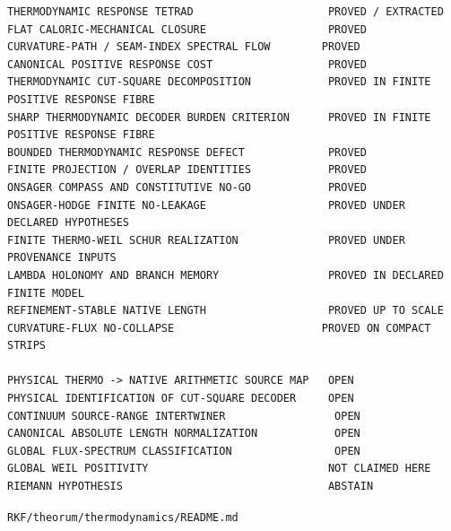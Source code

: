 \begin{verbatim}
THERMODYNAMIC RESPONSE TETRAD                     PROVED / EXTRACTED
FLAT CALORIC-MECHANICAL CLOSURE                   PROVED
CURVATURE-PATH / SEAM-INDEX SPECTRAL FLOW        PROVED
CANONICAL POSITIVE RESPONSE COST                  PROVED
THERMODYNAMIC CUT-SQUARE DECOMPOSITION            PROVED IN FINITE POSITIVE RESPONSE FIBRE
SHARP THERMODYNAMIC DECODER BURDEN CRITERION      PROVED IN FINITE POSITIVE RESPONSE FIBRE
BOUNDED THERMODYNAMIC RESPONSE DEFECT             PROVED
FINITE PROJECTION / OVERLAP IDENTITIES            PROVED
ONSAGER COMPASS AND CONSTITUTIVE NO-GO            PROVED
ONSAGER-HODGE FINITE NO-LEAKAGE                   PROVED UNDER DECLARED HYPOTHESES
FINITE THERMO-WEIL SCHUR REALIZATION              PROVED UNDER PROVENANCE INPUTS
LAMBDA HOLONOMY AND BRANCH MEMORY                 PROVED IN DECLARED FINITE MODEL
REFINEMENT-STABLE NATIVE LENGTH                   PROVED UP TO SCALE
CURVATURE-FLUX NO-COLLAPSE                       PROVED ON COMPACT STRIPS

PHYSICAL THERMO -> NATIVE ARITHMETIC SOURCE MAP   OPEN
PHYSICAL IDENTIFICATION OF CUT-SQUARE DECODER     OPEN
CONTINUUM SOURCE-RANGE INTERTWINER                 OPEN
CANONICAL ABSOLUTE LENGTH NORMALIZATION            OPEN
GLOBAL FLUX-SPECTRUM CLASSIFICATION                OPEN
GLOBAL WEIL POSITIVITY                            NOT CLAIMED HERE
RIEMANN HYPOTHESIS                                ABSTAIN
\end{verbatim}

\begin{flushright}\small\texttt{RKF/theorum/thermodynamics/README.md}\end{flushright}
